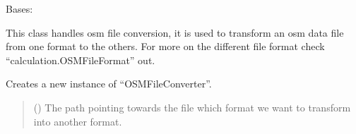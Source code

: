 \documentclass[letterpaper,10pt,english]{sphinxmanual}
\begin{document}
\begin{fulllineitems}
\label{\detokenize{apidoc/src.osm_configurator.model.project.calculation:src.osm_configurator.model.project.calculation.osm_file_converter.OSMFileConverter}}
\pysigstartsignatures
{}
\pysigstopsignatures
\sphinxAtStartPar
Bases: 

\sphinxAtStartPar
This class handles osm file conversion, it is used to transform an osm data file
from one format to the others.
For more on the different file format check “calculation.OSMFileFormat” out.

\begin{fulllineitems}
\label{\detokenize{apidoc/src.osm_configurator.model.project.calculation:src.osm_configurator.model.project.calculation.osm_file_converter.OSMFileConverter.__init__}}
\pysigstartsignatures
{}
\pysigstopsignatures
\sphinxAtStartPar
Creates a new instance of “OSMFileConverter”.
\begin{quote}\begin{description}
\sphinxAtStartPar
{} () \textendash{} The path pointing towards the file which format we want to transform into another format.

\end{description}\end{quote}

\end{fulllineitems}



\end{fulllineitems}
\end{document}
